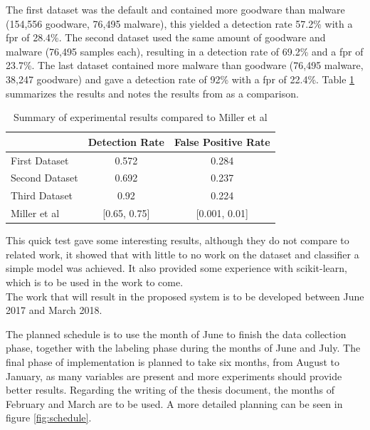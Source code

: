 \documentclass{llncs}
\begin{document}
The first dataset was the default and contained more goodware than malware (154,556 goodware, 76,495 malware), this yielded a detection rate 57.2\% with a \gls{fpr} of 28.4\%. The second dataset used the same amount of goodware and malware (76,495 samples each), resulting in a detection rate of 69.2\% and a \gls{fpr} of 23.7\%. The last dataset contained more malware than goodware (76,495 malware, 38,247 goodware) and gave a detection rate of 92\% with a \gls{fpr} of 22.4\%. Table \ref{tab:experimental} summarizes the results and notes the results from \cite{miller:rev_int} as a comparison.

\begin{table}[h!]
	\centering
	\def\arraystretch{1.5}
	\begin{tabular}{lcc}
		\toprule
		& Detection Rate        & False Positive Rate        \\
		\midrule
		First Dataset  & 0.572     & 0.284      \\ \hline
		Second Dataset & 0.692     & 0.237      \\ \hline
		Third Dataset  & 0.92      & 0.224      \\ \hline
		Miller et al   & [0.65, 0.75] & [0.001, 0.01] \\
		\bottomrule
	\end{tabular}
	\caption{Summary of experimental results compared to Miller et al\cite{miller:rev_int}}
	\label{tab:experimental}
\end{table}

This quick test gave some interesting results, although they do not compare to related work, it showed that with little to no work on the dataset and classifier a simple model was achieved. It also provided some experience with scikit-learn, which is to be used in the work to come.\\

The work that will result in the proposed system is to be developed between June 2017 and March 2018.

The planned schedule is to use the month of June to finish the data collection phase, together with the labeling phase during the months of June and July. The final phase of implementation is planned to take six months, from August to January, as many variables are present and more experiments should provide better results. Regarding the writing of the thesis document, the months of February and March are to be used. A more detailed planning can be seen in figure \ref{fig:schedule}.
\end{document}
